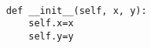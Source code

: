 \documentclass[12pt]{article}
\begin{document}
\begin{verbatim}

    def __init__(self, x, y): 
        self.x=x
        self.y=y

\end{verbatim}
\end{document}
